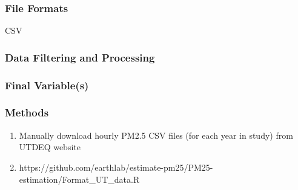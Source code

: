 


\subsubsection*{File Formats} 

CSV

\subsubsection*{Data Filtering and Processing}

\subsubsection*{Final Variable(s)}

\subsubsection*{Methods}

\begin{enumerate}
\item Manually download hourly PM2.5 CSV files (for each year in study) from UTDEQ website
\item https://github.com/earthlab/estimate-pm25/PM25-estimation/Format\_UT\_data.R
\end{enumerate}

